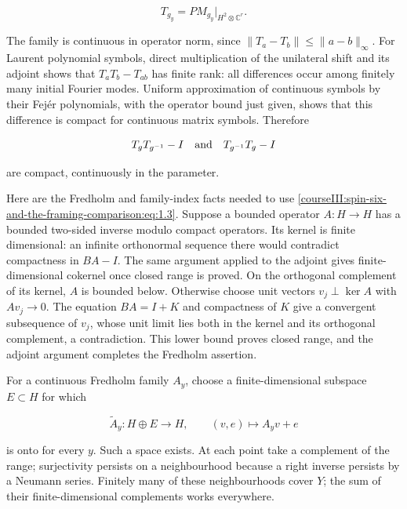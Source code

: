 \begin{equation}
T_{g_y}=P M_{g_y}|_{H^2\otimes\mathbb C^r}.
\label{courseIII:spin-six-and-the-framing-comparison:eq:1.2}
\end{equation}

The family is continuous in operator norm, since \(\|T_a-T_b\|\leq\|a-b\|_\infty\). For Laurent polynomial symbols, direct multiplication of the unilateral shift and its adjoint shows that \(T_aT_b-T_{ab}\) has finite rank: all differences occur among finitely many initial Fourier modes. Uniform approximation of continuous symbols by their Fejér polynomials, with the operator bound just given, shows that this difference is compact for continuous matrix symbols. Therefore

\begin{equation}
T_gT_{g^{-1}}-I\quad\hbox{and}\quad
T_{g^{-1}}T_g-I
\label{courseIII:spin-six-and-the-framing-comparison:eq:1.3}
\end{equation}

are compact, continuously in the parameter.

Here are the Fredholm and family-index facts needed to use \eqref{courseIII:spin-six-and-the-framing-comparison:eq:1.3}. Suppose a bounded operator \(A:H\to H\) has a bounded two-sided inverse modulo compact operators. Its kernel is finite dimensional: an infinite orthonormal sequence there would contradict compactness in \(BA-I\). The same argument applied to the adjoint gives finite-dimensional cokernel once closed range is proved. On the orthogonal complement of its kernel, \(A\) is bounded below. Otherwise choose unit vectors \(v_j\perp\ker A\) with \(Av_j\to0\). The equation \(BA=I+K\) and compactness of \(K\) give a convergent subsequence of \(v_j\), whose unit limit lies both in the kernel and its orthogonal complement, a contradiction. This lower bound proves closed range, and the adjoint argument completes the Fredholm assertion.

For a continuous Fredholm family \(A_y\), choose a finite-dimensional subspace \(E\subset H\) for which

\begin{equation}
\widetilde A_y:H\oplus E\longrightarrow H,
\qquad (v,e)\longmapsto A_yv+e
\label{courseIII:spin-six-and-the-framing-comparison:eq:1.4}
\end{equation}

is onto for every \(y\). Such a space exists. At each point take a complement of the range; surjectivity persists on a neighbourhood because a right inverse persists by a Neumann series. Finitely many of these neighbourhoods cover \(Y\); the sum of their finite-dimensional complements works everywhere.

